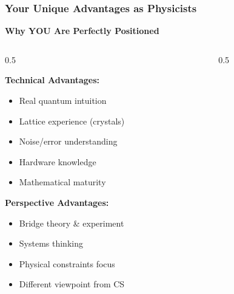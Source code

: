 \documentclass[aspectratio=169,10pt]{beamer}
\newcommand{\slideheader}[1]{\frametitle{#1}}
\theoremstyle{plain}
\begin{document}
\begin{frame}
  \slideheader{Your Unique Advantages as Physicists}
  
  \begin{center}
    \textbf{\large Why YOU Are Perfectly Positioned}
  \end{center}
  
  \vspace{0.5cm}
  
  \begin{columns}[T]
    \begin{column}{0.5\textwidth}

    \begin{greenBox}
      \textbf{Technical Advantages:}
      \begin{itemize}
        \item[\checkmark] Real quantum intuition
        \item[\checkmark] Lattice experience (crystals)
        \item[\checkmark] Noise/error understanding
        \item[\checkmark] Hardware knowledge
        \item[\checkmark] Mathematical maturity
      \end{itemize}
    \end{greenBox}
    
    \vspace{0.3cm}
    
    \begin{greenBox}
      \textbf{Perspective Advantages:}
      \begin{itemize}
        \item[\checkmark] Bridge theory \& experiment
        \item[\checkmark] Systems thinking
        \item[\checkmark] Physical constraints focus
        \item[\checkmark] Different viewpoint from CS
      \end{itemize}
    \end{greenBox}
  
    \end{column}
    \begin{column}{0.5\textwidth}

\end{column}
\end{columns}
\end{frame}
\end{document}
